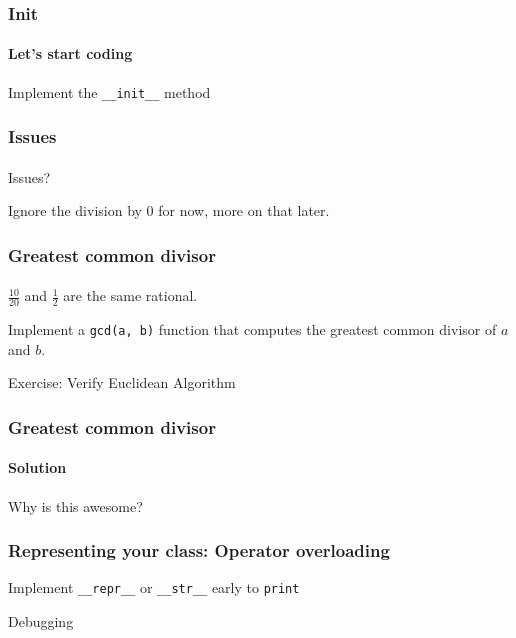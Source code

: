 \begin{frame}[fragile]\frametitle{Init}
    \framesubtitle{Let's start coding}

    Implement the \verb|__init__| method

    \pause\vfill


\end{frame}

\begin{frame}\frametitle{Issues}
    \framesubtitle{}

    Issues?


    \pause\vfill

    Ignore the division by 0 for now, more on that later.

\end{frame}

\begin{frame}\frametitle{Greatest common divisor}
    \framesubtitle{}

    $\frac{10}{20}$ and $\frac{1}{2}$ are
    the same rational.

    \vfill

    Implement a \texttt{gcd(a, b)} function that computes the greatest common
    divisor of $a$ and $b$.

    \vfill


    Exercise: Verify Euclidean Algorithm

\end{frame}

\begin{frame}\frametitle{Greatest common divisor}
    \framesubtitle{Solution}



    \vfill

    Why is this awesome?

\end{frame}

\begin{frame}\frametitle{Representing your class: Operator overloading}

    Implement \texttt{\_\_repr\_\_} or \texttt{\_\_str\_\_}
    early to \texttt{print}

    \vfill

    Debugging

\end{frame}

